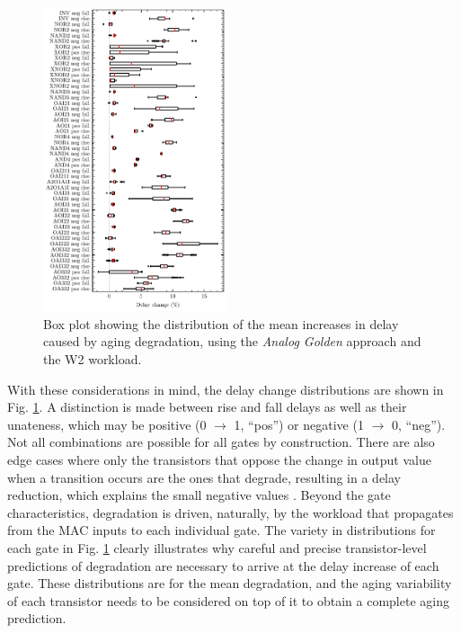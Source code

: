 \begin{figure}[!t]
    \includegraphics[width=0.48\textwidth,trim={0 0 0 0},clip]{images/ch2/box_cellwise_delay.pdf}
    \caption{Box plot showing the distribution of the mean increases in delay caused by aging degradation, using the \textit{Analog Golden} approach and the W2 workload. }
    \label{fig:cellwisedelay}
\end{figure}

With these considerations in mind, the delay change distributions are shown in Fig. \ref{fig:cellwisedelay}. A distinction is made between rise and fall delays as well as their unateness, which may be positive (0 $\xrightarrow{}$ 1, ``pos'') or negative (1 $\xrightarrow{}$ 0, ``neg''). Not all combinations are possible for all gates by construction. There are also edge cases where only the transistors that oppose the change in output value when a transition occurs are the ones that degrade, resulting in a delay reduction, which explains the small negative values \cite{santana-andreoImpactBTIHCI2022}. Beyond the gate characteristics, degradation is driven, naturally, by the workload that propagates from the MAC inputs to each individual gate. The variety in distributions for each gate in Fig. \ref{fig:cellwisedelay} clearly illustrates why careful and precise transistor-level predictions of degradation are necessary to arrive at the delay increase of each gate. These distributions are for the mean degradation, and the aging variability of each transistor needs to be considered on top of it to obtain a complete aging prediction. 

